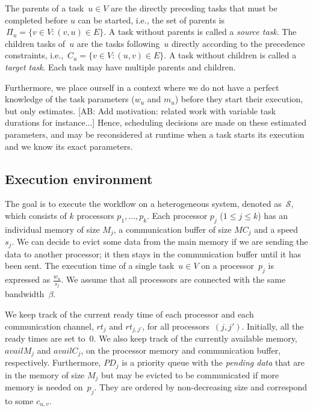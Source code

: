 \documentclass[conference]{IEEEtran}
\newcommand{\parents}[1]{\,\Pi_{#1}}
\newcommand{\children}[1]{\,C_{#1}}
\newcommand{\cluster}{\,\mathcal{S}}
\newcommand{\MM}{M}
\newcommand{\rt}{rt}
\newcommand{\PD}{PD}
\newcommand{\AB}[1]{{\color{purple}[AB: #1]}}
\begin{document}
    The parents of a task~$u\in V$ are the directly preceding tasks that must be completed before $u$ can be started, i.e., the set of parents is
    $ \parents{u} = \{v \in V: (v,u) \in E\}$. A task without parents is called a {\it source task}.
    The children tasks of~$u$ are the tasks following~$u$ directly according to the precedence constraints, i.e.,
    $ \children{u} = \{v \in V: (u,v) \in E\}$. A task without children is called a {\it target task}.
    Each task may have multiple parents and children.


Furthermore, we place ourself in a context where we do not have a perfect knowledge
of the task parameters ($w_u$ and $m_u$) before they start their execution,
but only estimates. \AB{Add motivation: related work with variable task durations for instance...}
Hence, scheduling decisions are made on these estimated parameters, and
may be reconsidered at runtime when a task starts its execution and we know
its exact parameters.


    \subsection{Execution environment}
    \label{sec.mod.plat}

    The goal is to execute the workflow on a heterogeneous system, denoted as $\cluster$, which
    consists of $k$ processors $p_1, \dots, p_k$.
    Each processor $p_j$ ($1 \leq j \leq k$) has an individual memory of size $M_j$, a communication
    buffer of size $MC_j$ and a speed~$s_j$.
    We can decide to evict some data from the main memory if we are sending the data
    to another processor; it then stays in the communication buffer until it has been sent.
    The execution time of a single task~$u\in V$ on a processor~$p_j$ is expressed as $\frac{w_u}{s_j}$.
    We assume that all processors are connected with the same bandwidth~$\beta$.

    We keep track of the current ready time of each processor and each communication
    channel, $\rt_j$ and $\rt_{j,j'}$, for all processors~$(j,j')$.
    Initially, all the ready times are set to~$0$.
    We also keep track of the currently available memory, $availM_j$ and $availC_j$,
    on the processor memory and communication buffer, respectively.
    Furthermore, $\PD_j$ is a priority queue with the {\em pending data}
    that are in the memory of size $\MM_j$ but may be evicted to be communicated if
    more memory is needed on~$p_j$. They are ordered by non-decreasing size and
    correspond to some $c_{u,v}$.
\end{document}
